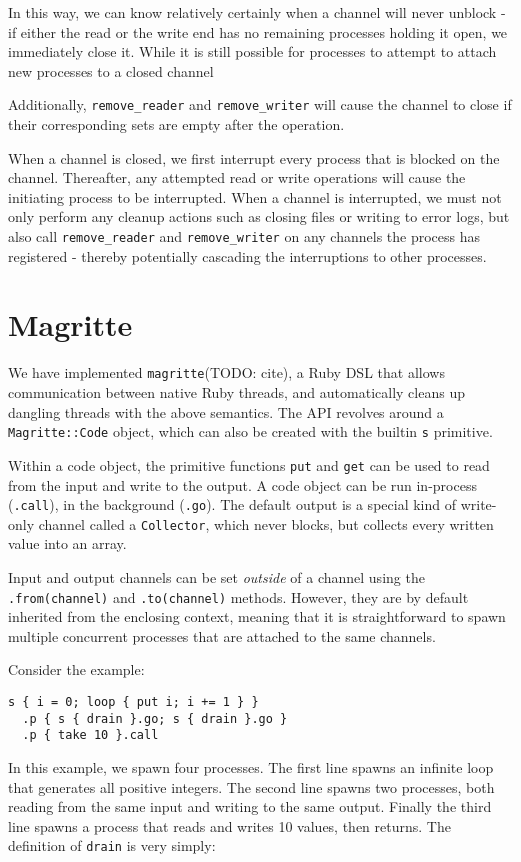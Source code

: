 \documentclass[sigplan,10pt,nosumlimits]{acmart}
\begin{document}
In this way, we can know relatively certainly when a channel will never unblock - if either the read or the write end has no remaining processes holding it open, we immediately close it. While it is still possible for processes to attempt to attach new processes to a closed channel

Additionally, \verb/remove_reader/ and \verb/remove_writer/ will cause the channel to close if their corresponding sets are empty after the operation.

When a channel is closed, we first interrupt every process that is blocked on the channel.
Thereafter, any attempted read or write operations will cause the initiating process to be interrupted.
When a channel is interrupted, we must not only perform any cleanup actions such as closing files or writing to error logs, but also call \verb/remove_reader/ and \verb/remove_writer/ on any channels the process has registered - thereby potentially cascading the interruptions to other processes.


\section{Magritte}

We have implemented \verb/magritte/(TODO: cite), a Ruby DSL that allows communication between native Ruby threads, and automatically cleans up dangling threads with the above semantics.
The API revolves around a \verb/Magritte::Code/ object, which can also be created with the builtin \verb/s/ primitive.

Within a code object, the primitive functions \verb/put/ and \verb/get/ can be used to read from the input and write to the output.
A code object can be run in-process (\verb/.call/), in the background (\verb/.go/).
The default output is a special kind of write-only channel called a \verb/Collector/, which never blocks, but collects every written value into an array.

Input and output channels can be set \emph{outside} of a channel using the \verb/.from(channel)/ and \verb/.to(channel)/ methods.
However, they are by default inherited from the enclosing context, meaning that it is straightforward to spawn multiple concurrent processes that are attached to the same channels.

Consider the example:

\begin{verbatim}
s { i = 0; loop { put i; i += 1 } }
  .p { s { drain }.go; s { drain }.go }
  .p { take 10 }.call
\end{verbatim}
In this example, we spawn four processes.
The first line spawns an infinite loop that generates all positive integers.
The second line spawns two processes, both reading from the same input and writing to the same output.
Finally the third line spawns a process that reads and writes 10 values, then returns. The definition of \verb/drain/ is very simply:
\end{document}
